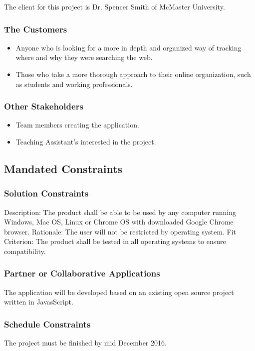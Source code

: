 \documentclass[12pt, titlepage]{article}
\begin{document}
The client for this project is Dr. Spencer Smith of McMaster University.

\subsubsection{The Customers}

\begin{itemize}
	\item Anyone who is looking for a more in depth and organized way of tracking where 
	and why they were searching the web.
	\item Those who take a more thorough approach to their online organization, such as 
	students and working professionals.
\end{itemize}

\subsubsection{Other Stakeholders}

\begin{itemize}
	\item Team members creating the application. 
	\item Teaching Assistant's interested in the project. 
\end{itemize}

\subsection{Mandated Constraints} %
\subsubsection{Solution Constraints}
Description: The product shall be able to be used by any computer running Windows, 
Mac OS, Linux or Chrome OS with downloaded Google Chrome browser.
Rationale: The user will not be restricted by operating system.
Fit Criterion: The product shall be tested in all operating systems to ensure compatibility. 

\subsubsection{Partner or Collaborative Applications}
The application will be developed based on an existing open source project written in 
JavasScript. 

\subsubsection{Schedule Constraints}
The project must be finished by mid December 2016.
\end{document}
